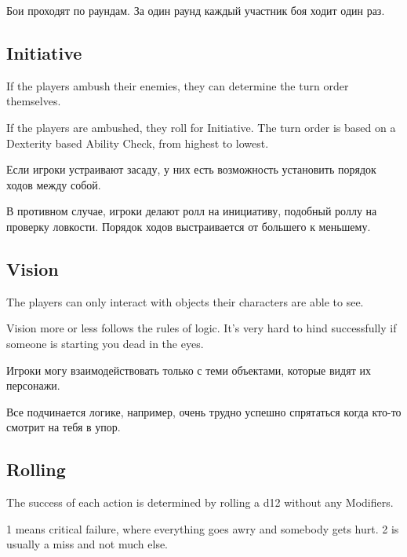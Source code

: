 \documentclass[a5paper,11pt]{book}
\begin{document}
\begin{multicols}{2}
\begin{ru}
Бои проходят по раундам. За один раунд каждый участник боя ходит один раз.
\end{ru}

\subsection{Initiative}
\begin{en}
If the players ambush their enemies, they can determine the turn order themselves.

If the players are ambushed, they roll for Initiative. The turn order is based on a Dexterity based Ability Check, from highest to lowest.
\end{en}

\begin{ru}
Если игроки устраивают засаду, у них есть возможность установить порядок ходов между собой.

В противном случае, игроки делают ролл на инициативу, подобный роллу на проверку ловкости. Порядок ходов выстраивается от большего к меньшему.
\end{ru}

\subsection{Vision}
\begin{en}
The players can only interact with objects their characters are able to see.

Vision more or less follows the rules of logic. It's very hard to hind successfully if someone is starting you dead in the eyes.
\end{en}

\begin{ru}
Игроки могу взаимодействовать только с теми объектами, которые видят их персонажи.

Все подчинается логике, например, очень трудно успешно спрятаться когда кто-то смотрит на тебя в упор.
\end{ru}

\subsection{Rolling}
\begin{en}
The success of each action is determined by rolling a d12 without any Modifiers.

1 means critical failure, where everything goes awry and somebody gets hurt. 2 is usually a miss and not much else.


\end{en}
\end{multicols}
\end{document}
